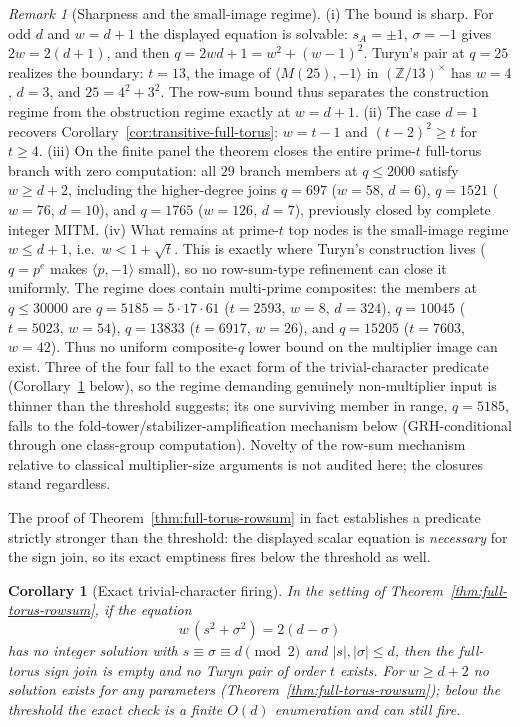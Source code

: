 \documentclass[11pt]{article}
\theoremstyle{plain}
\newtheorem{corollary}[theorem]{Corollary}
\theoremstyle{definition}
\theoremstyle{remark}
\newtheorem{remark}[theorem]{Remark}
\newcommand{\Z}{\mathbb Z}
\begin{document}
\begin{remark}[Sharpness and the small-image regime]\label{rem:rowsum-sharp}
(i) The bound is sharp.  For odd $d$ and $w=d+1$ the displayed equation is
solvable: $s_A=\pm1$, $\sigma=-1$ gives $2w=2(d+1)$, and then
$q=2wd+1=w^2+(w-1)^2$.  Turyn's pair at $q=25$ realizes the boundary:
$t=13$, the image of $\langle M(25),-1\rangle$ in $(\Z/13)^\times$ has
$w=4$, $d=3$, and $25=4^2+3^2$.  The row-sum bound thus separates the
construction regime from the obstruction regime exactly at $w=d+1$.
(ii) The case $d=1$ recovers Corollary~\ref{cor:transitive-full-torus}:
$w=t-1$ and $(t-2)^2\ge t$ for $t\ge4$.
(iii) On the finite panel the theorem closes the entire prime-$t$
full-torus branch with zero computation: all $29$ branch members at
$q\le2000$ satisfy $w\ge d+2$, including the higher-degree joins $q=697$
($w=58$, $d=6$), $q=1521$ ($w=76$, $d=10$), and $q=1765$ ($w=126$,
$d=7$), previously closed by complete integer MITM.
(iv) What remains at prime-$t$ top nodes is the small-image regime
$w\le d+1$, i.e.\ $w<1+\sqrt t$.  This is exactly where Turyn's
construction lives ($q=p^e$ makes $\langle p,-1\rangle$ small), so no
row-sum-type refinement can close it uniformly.  The regime does contain
multi-prime composites: the members at $q\le30000$ are
$q=5185=5\cdot17\cdot61$ ($t=2593$, $w=8$, $d=324$), $q=10045$
($t=5023$, $w=54$), $q=13833$ ($t=6917$, $w=26$), and $q=15205$
($t=7603$, $w=42$).  Thus no uniform composite-$q$ lower bound on the
multiplier image can exist.  Three of the four fall to the exact form
of the trivial-character predicate
(Corollary~\ref{cor:full-torus-exact-char} below), so the regime
demanding genuinely non-multiplier input is thinner than the threshold
suggests; its one surviving member in range, $q=5185$, falls to the
fold-tower/stabilizer-amplification mechanism below (GRH-conditional
through one class-group computation).
Novelty of the row-sum mechanism relative to classical multiplier-size
arguments is not audited here; the closures stand regardless.
\end{remark}

The proof of Theorem~\ref{thm:full-torus-rowsum} in fact establishes a
predicate strictly stronger than the threshold: the displayed scalar
equation is \emph{necessary} for the sign join, so its exact emptiness
fires below the threshold as well.

\begin{corollary}[Exact trivial-character firing]
\label{cor:full-torus-exact-char}
In the setting of Theorem~\ref{thm:full-torus-rowsum}, if the equation
\[
  w\,(s^2+\sigma^2)=2(d-\sigma)
\]
has no integer solution with $s\equiv\sigma\equiv d\pmod2$ and
$|s|,|\sigma|\le d$, then the full-torus sign join is empty and no
Turyn pair of order $t$ exists.  For $w\ge d+2$ no solution exists for
any parameters (Theorem~\ref{thm:full-torus-rowsum}); below the
threshold the exact check is a finite $O(d)$ enumeration and can still
fire.
\end{corollary}
\end{document}
